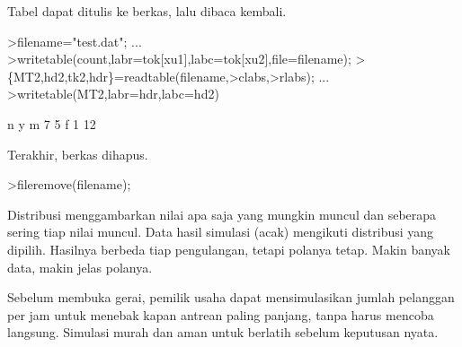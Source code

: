 \documentclass[a4paper,10pt]{article}
\begin{document}
\begin{eulernotebook}
\begin{eulercomment}
\begin{eulercomment}
\begin{eulercomment}
\begin{eulercomment}
\begin{eulercomment}
\begin{eulercomment}
\begin{eulercomment}
\begin{eulercomment}
\begin{eulercomment}
Tabel dapat ditulis ke berkas, lalu dibaca kembali.
\end{eulercomment}
\begin{eulerprompt}
>filename="test.dat"; ...
>writetable(count,labr=tok[xu1],labc=tok[xu2],file=filename);
>\{MT2,hd2,tk2,hdr\}=readtable(filename,>clabs,>rlabs); ...
>writetable(MT2,labr=hdr,labc=hd2)
\end{eulerprompt}
\begin{euleroutput}
                     n         y
           m         7         5
           f         1        12
\end{euleroutput}
\begin{eulercomment}
Terakhir, berkas dihapus.
\end{eulercomment}
\begin{eulerprompt}
>fileremove(filename);
\end{eulerprompt}
\begin{eulercomment}
\begin{eulercomment}
\begin{eulercomment}
\end{eulercomment}
\begin{eulercomment}
Distribusi menggambarkan nilai apa saja yang mungkin muncul dan seberapa sering tiap nilai
muncul. Data hasil simulasi (acak) mengikuti distribusi yang dipilih. Hasilnya berbeda tiap
pengulangan, tetapi polanya tetap. Makin banyak data, makin jelas polanya.

\end{eulercomment}
\begin{eulercomment}
Sebelum membuka gerai, pemilik usaha dapat mensimulasikan jumlah pelanggan per jam untuk
menebak kapan antrean paling panjang, tanpa harus mencoba langsung. Simulasi murah dan aman
untuk berlatih sebelum keputusan nyata.


\end{eulercomment}
\end{eulercomment}
\end{eulercomment}
\end{eulercomment}
\end{eulercomment}
\end{eulercomment}
\end{eulercomment}
\end{eulercomment}
\end{eulercomment}
\end{eulercomment}
\end{eulercomment}
\end{eulernotebook}
\end{document}
